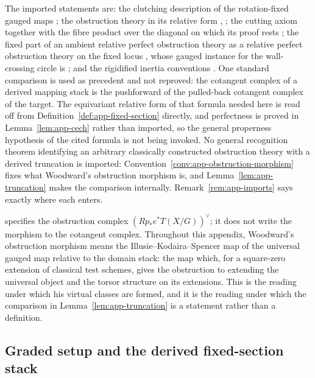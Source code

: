 The imported statements are: the clutching description of the rotation-fixed
gauged maps \cite[Definition~9.7, Lemmas~9.8 and~9.9,
Corollary~9.10]{WoodwardQKIII}; the obstruction theory
\cite[Definition~7.13]{WoodwardQKIII} in its relative form
\cite[Section~8.3]{WoodwardQKIII}, \cite[Example~6.6(c)]{WoodwardQKII}; the
cutting axiom \cite[Proposition~7.14(b)]{WoodwardQKIII} together with the fibre
product over the diagonal on which its proof rests
\cite[Proposition~5.21]{WoodwardQKII}; the fixed part of an ambient relative
perfect obstruction theory as a relative perfect obstruction theory on the
fixed locus \cite{GraberPandharipande}, whose gauged instance for the
wall-crossing circle is \cite[Corollary~3.20]{GonzalezWoodward}; and the
rigidified
inertia conventions
\cite[Section~4.3, Example~4.3(f),(g)]{WoodwardQKII}.  One standard
comparison is used as precedent and not reproved: the cotangent complex of a
derived mapping stack is the pushforward of the pulled-back cotangent complex
of the target.  The equivariant relative form of that formula needed here is
read off from Definition~\ref{def:app-fixed-section} directly, and perfectness
is proved in Lemma~\ref{lem:app-cech} rather than imported, so the general
properness hypothesis of the cited formula is not being invoked.  No general
recognition theorem identifying an arbitrary classically constructed
obstruction theory with a derived truncation is imported:
Convention~\ref{conv:app-obstruction-morphism} fixes what Woodward's
obstruction morphism is, and Lemma~\ref{lem:app-truncation} makes the
comparison internally.
Remark~\ref{rem:app-imports} says exactly where each enters.

\begin{convention}
\label{conv:app-obstruction-morphism}
\cite[Definition~7.13]{WoodwardQKIII} specifies the obstruction complex
\((Rp_*e^*T(X/G))^\vee\); it does not write the morphism to the cotangent
complex.  Throughout this appendix, Woodward's obstruction morphism means the
Illusie--Kodaira--Spencer map of the universal gauged map relative to the
domain stack: the map which, for a square-zero extension of classical test
schemes, gives the obstruction to extending the universal object and the
torsor structure on its extensions.  This is the reading under which his
virtual classes are formed, and it is the reading under which the comparison in
Lemma~\ref{lem:app-truncation} is a statement rather than a definition.
\end{convention}

\subsection{Graded setup and the derived fixed-section stack}
\label{app:setup}

